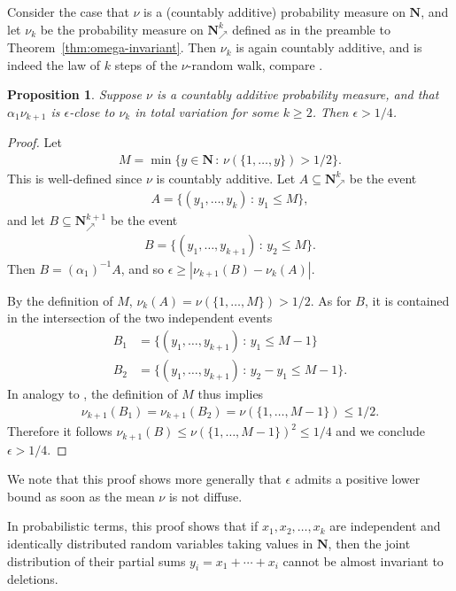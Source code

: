 \documentclass[12pt, pdflatex]{amsart}
\newtheorem{proposition}[theorem]{Proposition}
\theoremstyle{definition}
\numberwithin{equation}{section}
\numberwithin{theorem}{section}
\newcommand{\NN}{\mathbf{N}}
\newcommand{\incr}{\NN_\nearrow}
\begin{document}
Consider the case that $\nu$ is a (countably additive) probability measure on $\NN$, and let $\nu_k$ be the probability measure on $\incr^k$ defined as in the preamble to Theorem~\ref{thm:omega-invariant}. Then $\nu_k$ is again countably additive, and is indeed the law of $k$ steps of the $\nu$-random walk, compare .

\begin{proposition}
    \label{prop:no_random_walk}
    Suppose $\nu$ is a countably additive probability measure, and that $\alpha_{1}\nu_{k+1}$ is $\epsilon$-close to $\nu_k$ in total variation for some $k\geq 2$. Then $\epsilon > 1/4$.
\end{proposition}
\begin{proof}
  Let 
  \begin{align*}
      M = \min \{y \in \NN\,:\, \nu(\{1,\ldots,y\}) > 1/2\}.
  \end{align*}
  This is well-defined since $\nu$ is countably additive. Let $A \subseteq \incr^k$ be the event
  \begin{align*}
      A = \{(y_1,\ldots,y_k) \,:\, y_1 \leq M\},
  \end{align*}
  and let $B \subseteq \incr^{k+1}$ be the event
  \begin{align*}
      B = \{(y_1,\ldots,y_{k+1}) \,:\, y_2 \leq M\}.
  \end{align*}
  Then $B = (\alpha_{1})^{-1}A$, and so $\epsilon \geq |\nu_{k+1}(B)-\nu_k(A)|$. 
  
  By the definition of $M$, $\nu_k(A) = \nu(\{1,\ldots,M\}) > 1/2$. As for $B$, it is contained in the intersection of the two independent events
  \begin{align*}
      B_1 &= \{(y_1,\ldots,y_{k+1}) \,:\, y_1 \leq M-1\}\\
      B_2 &= \{(y_1,\ldots,y_{k+1}) \,:\, y_2-y_1 \leq M-1\}.
  \end{align*}
  In analogy to , the definition of $M$ thus implies 
  \begin{align*}
      \nu_{k+1}(B_1) = \nu_{k+1}(B_2) = \nu(\{1,\ldots,M-1\}) \leq 1/2.
  \end{align*}
  Therefore it follows $\nu_{k+1}(B) \leq \nu(\{1,\ldots,M-1\})^2 \leq 1/4$ and we conclude $\epsilon > 1/4$.
\end{proof}

We note that this proof shows more generally that $\epsilon$ admits a positive lower bound as soon as the mean $\nu$ is not diffuse. 

In probabilistic terms, this proof shows that if $x_1,x_2,\ldots,x_k$ are independent and identically distributed random variables taking values in $\NN$, then the joint distribution of their partial sums $y_i = x_1+\cdots+x_i$ cannot be almost invariant to deletions. 
\end{document}
